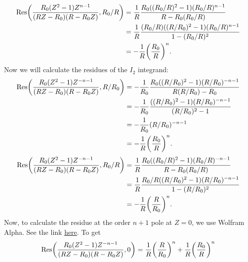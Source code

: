 \documentclass{article}
\begin{document}
\[\begin{aligned}
\text{Res}\qty(\frac{R_0(Z^2-1)Z^{n-1}}{(RZ-R_0)(R-R_0Z)}, R_0/R) &= \frac{1}{R}\frac{R_0((R_0/R)^2-1)(R_0/R)^{n-1}}{R-R_0(R_0/R)} \\
&= \frac{1}{R}\frac{(R_0/R)((R/R_0)^2-1)(R_0/R)^{n-1}}{1-(R_0/R)^2} \\
&= -\frac{1}{R} \qty(\frac{R_0}{R})^{n}.
\end{aligned}\]
Now we will calculate the residues of the $I_2$ integrand:
\[\begin{aligned}
\text{Res}\qty(\frac{R_0(Z^2-1)Z^{-n-1}}{(RZ-R_0)(R-R_0Z)}, R/R_0) &= -\frac{1}{R_0}\frac{R_0((R/R_0)^2-1)(R/R_0)^{-n-1}}{R(R/R_0)-R_0} \\
&= -\frac{1}{R_0}\frac{((R/R_0)^2-1)(R/R_0)^{-n-1}}{(R/R_0)^2-1} \\
&= -\frac{1}{R_0}(R/R_0)^{-n-1} \\
&= -\frac{1}{R} \qty(\frac{R_0}{R})^{n}.
\end{aligned}\]
\[\begin{aligned}
\text{Res}\qty(\frac{R_0(Z^2-1)Z^{-n-1}}{(RZ-R_0)(R-R_0Z)}, R_0/R) &= \frac{1}{R}\frac{R_0((R_0/R)^2-1)(R_0/R)^{-n-1}}{R-R_0(R_0/R)} \\
&= \frac{1}{R}\frac{R_0/R((R/R_0)^2-1)(R/R_0)^{-n-1}}{1-(R/R_0)^2} \\
&= -\frac{1}{R} \qty(\frac{R}{R_0})^{n}.
\end{aligned}\]
Now, to calculate the residue at the order \( n+1 \) pole at \( Z=0 \), we use Wolfram Alpha. See the link 
\href{https://www.wolframalpha.com/input?i=Residue%5Bpi%28Z%5E2-1%29Z%5E%28-16-1%29%2F%28%28exp%281%29Z-pi%29*%28exp%281%29-piZ%29%29%2C+%7BZ%2C+0%7D%5D}{here}.
To get
\[\begin{aligned}
\text{Res}\qty(\frac{R_0(Z^2-1)Z^{-n-1}}{(RZ-R_0)(R-R_0Z)}, 0) &= \frac{1}{R}\qty(\frac{R}{R_0})^n + \frac{1}{R}\qty(\frac{R_0}{R})^n \\
\end{aligned}\]
\end{document}
